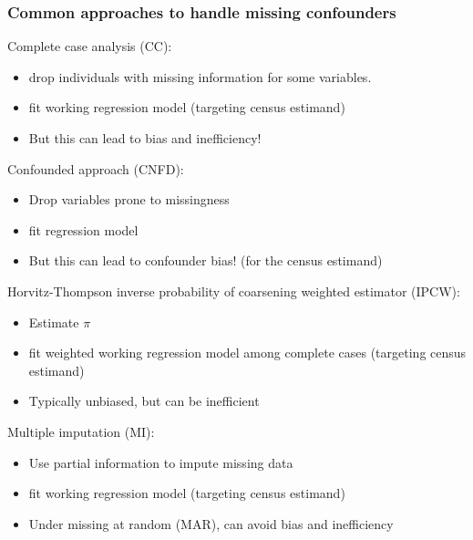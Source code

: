 \documentclass[10pt, table]{beamer}
\begin{document}
\begin{frame} \frametitle{Common approaches to handle missing confounders}
Complete case analysis (CC): \vspace{-.4cm}
\begin{itemize}
  \item drop individuals with missing information for some variables.
  \item fit working regression model (targeting census estimand)
  \item But this can lead to bias and inefficiency!
\end{itemize} \pause

Confounded approach (CNFD):  \vspace{-.4cm}
\begin{itemize}
  \item Drop variables prone to missingness
  \item fit regression model 
  \item But this can lead to confounder bias! (for the census estimand)
\end{itemize} \pause

Horvitz-Thompson inverse probability of coarsening weighted estimator (IPCW): \vspace{-.4cm}
\begin{itemize}
  \item Estimate $\pi$
  \item fit weighted working regression model among complete cases (targeting census estimand)
  \item Typically unbiased, but can be inefficient
\end{itemize} \pause

Multiple imputation (MI): \vspace{-.4cm}
\begin{itemize}
  \item Use partial information to impute missing data
  \item fit working regression model (targeting census estimand)
  \item Under missing at random (MAR), can avoid bias and inefficiency
\end{itemize}

\end{frame}
\end{document}
